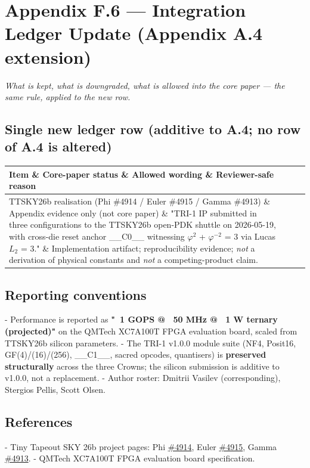 
\section{Appendix F.6 --- Integration Ledger Update (Appendix A.4 extension)}

\textit{What is kept, what is downgraded, what is allowed into the core paper --- the same rule, applied to the new row.}

\subsection{Single new ledger row (additive to A.4; no row of A.4 is altered)}

\begin{tabular}{|l|l|l|l|}
\hline
Item \& Core-paper status \& Allowed wording \& Reviewer-safe reason \\
\hline
TTSKY26b realisation (Phi \#4914 / Euler \#4915 / Gamma \#4913) \& Appendix evidence only (not core paper) \& "TRI-1 IP submitted in three configurations to the TTSKY26b open-PDK shuttle on 2026-05-19, with cross-die reset anchor \_\_C0\_\_ witnessing $\varphi^{2}$ + $\varphi^{-2}$ = 3 via Lucas $L_{2}$ = 3." \& Implementation artifact; reproducibility evidence; \textit{not} a derivation of physical constants and \textit{not} a competing-product claim. \\
\hline
\end{tabular}
\subsection{Reporting conventions}

- Performance is reported as \textbf{"~1 GOPS @ ~50 MHz @ ~1 W ternary (projected)"} on the QMTech XC7A100T FPGA evaluation board, scaled from TTSKY26b silicon parameters.
- The TRI-1 v1.0.0 module suite (NF4, Posit16, GF(4)/(16)/(256), \_\_C1\_\_, sacred opcodes, quantisers) is \textbf{preserved structurally} across the three Crowns; the silicon submission is additive to v1.0.0, not a replacement.
- Author roster: Dmitrii Vasilev (corresponding), Stergios Pellis, Scott Olsen.

\subsection{References}

- Tiny Tapeout SKY 26b project pages: Phi \href{https://app.tinytapeout.com/projects/4914}{\#4914}, Euler \href{https://app.tinytapeout.com/projects/4915}{\#4915}, Gamma \href{https://app.tinytapeout.com/projects/4913}{\#4913}.
- QMTech XC7A100T FPGA evaluation board specification.
